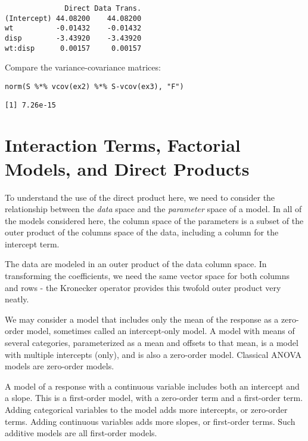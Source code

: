 \documentclass[]{article}
\begin{document}
\begin{verbatim}
              Direct Data Trans.
(Intercept) 44.08200    44.08200
wt          -0.01432    -0.01432
disp        -3.43920    -3.43920
wt:disp      0.00157     0.00157
\end{verbatim}

Compare the variance-covariance matrices:

\begin{verbatim}
norm(S %*% vcov(ex2) %*% S-vcov(ex3), "F")
\end{verbatim}

\begin{verbatim}
[1] 7.26e-15
\end{verbatim}

\hypertarget{interaction-terms-factorial-models-and-direct-products}{%
\section{Interaction Terms, Factorial Models, and Direct
Products}\label{interaction-terms-factorial-models-and-direct-products}}

To understand the use of the direct product here, we need to consider
the relationship between the \emph{data} space and the \emph{parameter}
space of a model. In all of the models considered here, the column space
of the parameters is a subset of the outer product of the columns space
of the data, including a column for the intercept term.

The data are modeled in an outer product of the data column space. In
transforming the coefficients, we need the same vector space for both
columns and rows - the Kronecker operator provides this twofold outer
product very neatly.

We may consider a model that includes only the mean of the response as a
zero-order model, sometimes called an intercept-only model. A model with
means of several categories, parameterized as a mean and offsets to that
mean, is a model with multiple intercepts (only), and is also a
zero-order model. Classical ANOVA models are zero-order models.

A model of a response with a continuous variable includes both an
intercept and a slope. This is a first-order model, with a zero-order
term and a first-order term. Adding categorical variables to the model
adds more intercepts, or zero-order terms. Adding continuous variables
adds more slopes, or first-order terms. Such additive models are all
first-order models.
\end{document}
